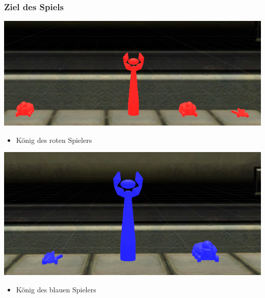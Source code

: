 ﻿\documentclass{beamer}
\begin{document}
\begin{frame} %
  \frametitle{Ziel des Spiels} %
	
	\begin{minipage}[]{0.45\textwidth}
		\includegraphics[width=\textwidth]{Abbildungen/King.PNG}
	\end{minipage}
	\begin{minipage}[]{0.45\textwidth}
		\begin{itemize}
			\item König des roten Spielers
		\end{itemize}
	\end{minipage}
	
	\begin{minipage}[]{0.45\textwidth}
		\includegraphics[width=\textwidth]{Abbildungen/King2.PNG}
	\end{minipage}
	\begin{minipage}[]{0.45\textwidth}
		\begin{itemize}
			\item König des blauen Spielers
		\end{itemize}
	\end{minipage}
	
\end{frame}
\end{document}
